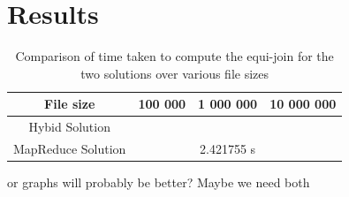 \documentclass[10pt,twocolumn]{witseiepaper}
\begin{document}
%
%

\section{Results}

\begin{table} [h]
	\centering
	\caption{Comparison of time taken to compute the equi-join for the two solutions over various file sizes}
	\label{tab:results}

\begin{tabular}{|c|c|c|c|}
	\hline 
	File size & 100 000 & 1 000 000 & 10 000 000 \\ 
	\hline
	\hline 
	Hybid Solution &  &  &  \\ 
	\hline 
	MapReduce Solution &  & 2.421755 s &  \\ 
	\hline 
\end{tabular} 
\end{table}

or graphs will probably be better? Maybe we need both
\end{document}
